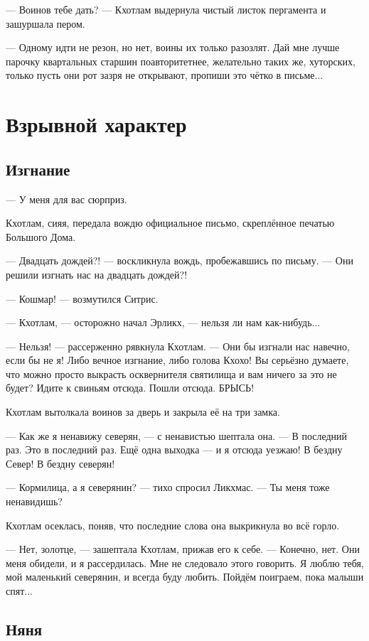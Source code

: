 --- Воинов тебе дать? --- Кхотлам выдернула чистый листок пергамента и зашуршала пером.

--- Одному идти не резон, но нет, воины их только разозлят.
Дай мне лучше парочку квартальных старшин поавторитетнее, желательно таких же, хуторских, только пусть они рот зазря не открывают, пропиши это чётко в письме...

\chapter{Взрывной характер}

\section{Изгнание}

--- У меня для вас сюрприз.

Кхотлам, сияя, передала вождю официальное письмо, скреплённое печатью Большого Дома.

--- Двадцать дождей?! --- воскликнула вождь, пробежавшись по письму.
--- Они решили изгнать нас на двадцать дождей?!

--- Кошмар! --- возмутился Ситрис.

--- Кхотлам, --- осторожно начал Эрликх, --- нельзя ли нам как-нибудь...

--- Нельзя! --- рассерженно рявкнула Кхотлам.
--- Они бы изгнали нас навечно, если бы не я!
Либо вечное изгнание, либо голова Кхохо!
Вы серьёзно думаете, что можно просто выкрасть осквернителя святилища и вам ничего за это не будет?
Идите к свиньям отсюда.
Пошли отсюда.
БРЫСЬ!

Кхотлам вытолкала воинов за дверь и закрыла её на три замка.

--- Как же я ненавижу северян, --- с ненавистью шептала она.
--- В последний раз.
Это в последний раз.
Ещё одна выходка --- и я отсюда уезжаю!
В бездну Север!
В бездну северян!

--- Кормилица, а я северянин? --- тихо спросил Ликхмас.
--- Ты меня тоже ненавидишь?

Кхотлам осеклась, поняв, что последние слова она выкрикнула во всё горло.

--- Нет, золотце, --- зашептала Кхотлам, прижав его к себе.
--- Конечно, нет.
Они меня обидели, и я рассердилась.
Мне не следовало этого говорить.
Я люблю тебя, мой маленький северянин, и всегда буду любить.
Пойдём поиграем, пока малыши спят...

\section{Няня}

